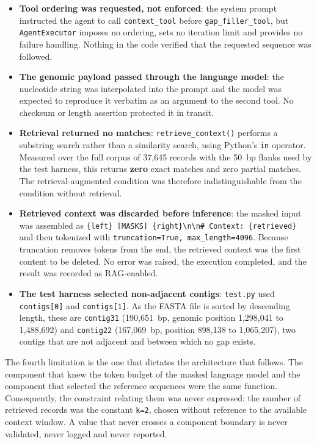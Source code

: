 \begin{itemize}
    \item \textbf{Tool ordering was requested, not enforced}: the system prompt instructed
    the agent to call \texttt{context\_tool} before \texttt{gap\_filler\_tool}, but
    \texttt{AgentExecutor} imposes no ordering, sets no iteration limit and provides no
    failure handling. Nothing in the code verified that the requested sequence was
    followed.

    \item \textbf{The genomic payload passed through the language model}: the nucleotide
    string was interpolated into the prompt and the model was expected to reproduce it
    verbatim as an argument to the second tool. No checksum or length assertion protected
    it in transit.

    \item \textbf{Retrieval returned no matches}: \texttt{retrieve\_context()} performs a
    substring search rather than a similarity search, using Python's \texttt{in} operator.
    Measured over the full corpus of 37{,}645 records with the 50~bp flanks used by the
    test harness, this returns \textbf{zero} exact matches and zero partial matches. The
    retrieval-augmented condition was therefore indistinguishable from the condition
    without retrieval.

    \item \textbf{Retrieved context was discarded before inference}: the masked input was
    assembled as \texttt{\{left\} [MASKS] \{right\}\textbackslash n\textbackslash n\# Context:
    \{retrieved\}} and then tokenized with \texttt{truncation=True, max\_length=4096}.
    Because truncation removes tokens from the end, the retrieved context was the first
    content to be deleted. No error was raised, the execution completed, and the result was
    recorded as RAG-enabled.

    \item \textbf{The test harness selected non-adjacent contigs}: \texttt{test.py} used
    \texttt{contigs[0]} and \texttt{contigs[1]}. As the FASTA file is sorted by descending
    length, these are \texttt{contig31} (190{,}651~bp, genomic position 1{,}298{,}041 to
    1{,}488{,}692) and \texttt{contig22} (167{,}069~bp, position 898{,}138 to
    1{,}065{,}207), two contigs that are not adjacent and between which no gap exists.
\end{itemize}

The fourth limitation is the one that dictates the architecture that follows. The component
that knew the token budget of the masked language model and the component that selected the
reference sequences were the same function. Consequently, the constraint relating them was
never expressed: the number of retrieved records was the constant \texttt{k=2}, chosen
without reference to the available context window. A value that never crosses a component
boundary is never validated, never logged and never reported.

